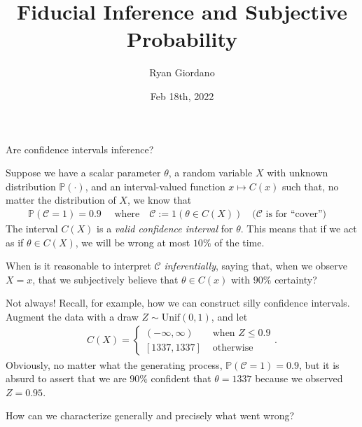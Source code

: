 \documentclass[8pt]{beamer}\usepackage[]{graphicx}\usepackage[]{color}
\title{Fiducial Inference and Subjective Probability}
\author{Ryan Giordano}
\date{Feb 18th, 2022}
\institute{Massachusetts Institute of Technology}
\def\p#1{\mathbb{P}\left(#1\right)}
\def\ind#1{1\left(#1\right)}
\def\cover{\mathscr{C}}
\begin{document}

\begin{frame}{Are confidence intervals inference?}

Suppose we have a scalar parameter $\theta$, a random variable $X$ with unknown
distribution $\p{\cdot}$, and an interval-valued function $x \mapsto C(x)$ such
that, no matter the distribution of $X$, we know that
%
\begin{align*}
%
\p{\cover = 1} = 0.9
\quad\textrm{ where}\quad
\cover := \ind{\theta \in C(X)}
\quad\textrm{(}\cover\textrm{ is for ``cover'')}\quad
%
\end{align*}
%
The interval $C(X)$ is a {\em valid confidence interval} for $\theta$. This
means that if we act as if $\theta \in C(X)$, we will be wrong at most $10\%$ of
the time.

\pause

\hrulefill

When is it reasonable to interpret $\cover$ {\em inferentially}, saying
that, when we observe $X=x$, that we subjectively believe that $\theta \in C(x)$
with $90\%$ certainty?

\pause
Not always!
Recall, for example, how we can construct silly confidence
intervals. Augment the data with a draw $Z \sim \mathrm{Unif}(0, 1)$, and let
%
\begin{align*}
%
C(X) =
\begin{cases}
    (-\infty, \infty) & \textrm{ when } Z \le 0.9 \\
    [1337, 1337] & \textrm{ otherwise }
\end{cases}.
%
\end{align*}
%
Obviously, no matter what the generating process, $\p{\cover = 1} = 0.9$,
but it is absurd to assert that we are $90\%$ confident that
$\theta = 1337$ because we observed $Z = 0.95$.

\pause

How can we characterize generally and precisely what went wrong?
%
\end{frame}



\end{document}

